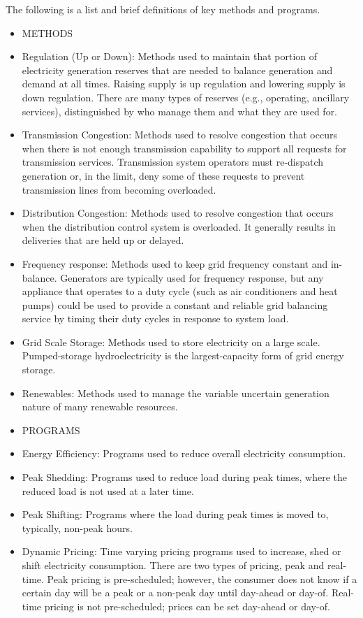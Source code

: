 The following is a list and brief definitions of key methods and programs.  

\begin{itemize}
\item METHODS
\item Regulation (Up or Down): Methods used to maintain that portion of electricity generation reserves 
that are needed to balance generation and demand at all times.  Raising supply is up regulation and lowering 
supply is down regulation. There are many types of reserves 
(e.g., operating, ancillary services), distinguished by who manage them and what they are used for.
\item Transmission Congestion: Methods used to resolve congestion that occurs when there is not enough 
transmission capability to support all requests for transmission services. Transmission system operators 
must re-dispatch generation or, 
in the limit, deny some of these requests to prevent transmission lines from becoming overloaded.
\item Distribution Congestion:  Methods used to resolve congestion that occurs when the distribution control system 
is overloaded.  It generally results in deliveries that are held up or delayed.  
\item Frequency response:  Methods used to keep grid frequency constant and in-balance. 
Generators are typically used for frequency response, but any appliance that operates to a duty cycle 
(such as air conditioners and heat pumps) could be used to provide a 
constant and reliable grid balancing service by timing their duty cycles in response to system load.   
\item Grid Scale Storage:  Methods used to store electricity on a large scale. 
Pumped-storage hydroelectricity is the largest-capacity form of grid energy storage. 
\item Renewables:  Methods used to manage the variable uncertain generation nature of many renewable resources. 
\item PROGRAMS
\item Energy Efficiency:  Programs used to reduce overall electricity consumption.
\item Peak Shedding:  Programs used to reduce load during peak times, 
where the reduced load is not used at a later time. 
\item Peak Shifting:  Programs where the load during peak times is moved to, typically, non-peak hours. 
\item Dynamic Pricing:  Time varying pricing programs used to increase, shed or shift electricity consumption. 
There are two types of pricing, peak and real-time.  Peak pricing is pre-scheduled; however, the consumer 
does not know if a certain day will be a peak or a non-peak day until day-ahead or day-of.  
Real-time pricing is not pre-scheduled; prices can be set day-ahead or day-of.
\end{itemize}

